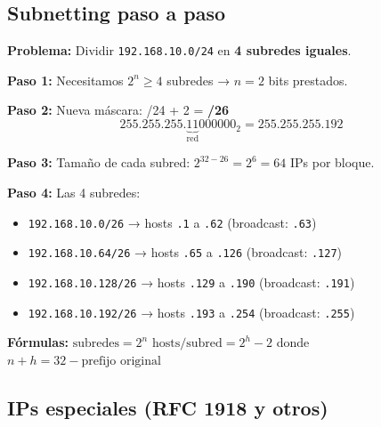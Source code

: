 \subsection{Subnetting paso a paso}

\begin{ejemplo}
\textbf{Problema:} Dividir \texttt{192.168.10.0/24} en \textbf{4 subredes iguales}.

\textbf{Paso 1:} Necesitamos $2^n \geq 4$ subredes → $n = 2$ bits prestados.

\textbf{Paso 2:} Nueva máscara: /24 + 2 = \textbf{/26}
\[ 255.255.255.\underbrace{11}_{\text{red}}000000_2 = 255.255.255.192 \]

\textbf{Paso 3:} Tamaño de cada subred: $2^{32-26} = 2^6 = 64$ IPs por bloque.

\textbf{Paso 4:} Las 4 subredes:
\begin{itemize}
    \item \texttt{192.168.10.0/26}   → hosts \texttt{.1} a \texttt{.62}   (broadcast: \texttt{.63})
    \item \texttt{192.168.10.64/26}  → hosts \texttt{.65} a \texttt{.126}  (broadcast: \texttt{.127})
    \item \texttt{192.168.10.128/26} → hosts \texttt{.129} a \texttt{.190} (broadcast: \texttt{.191})
    \item \texttt{192.168.10.192/26} → hosts \texttt{.193} a \texttt{.254} (broadcast: \texttt{.255})
\end{itemize}

\textbf{Fórmulas:}
$\text{subredes} = 2^n$ \quad $\text{hosts/subred} = 2^h - 2$ \quad donde $n+h = 32 - \text{prefijo original}$
\end{ejemplo}

\subsection{IPs especiales (RFC 1918 y otros)}

